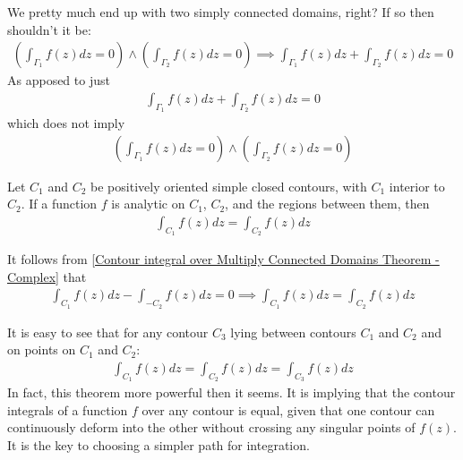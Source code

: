 \documentclass[12pt, english]{book}
\makeatletter
\renewenvironment{proof}[1][\proofname]{\par
	\pushQED{\qed}%
	\normalfont \topsep6\p@\@plus6\p@\relax
	\list{}{%
		\settowidth{\leftmargin}{\itshape\proofname:\hskip\labelsep}%
		\setlength{\labelwidth}{0pt}%
		\setlength{\itemindent}{-\leftmargin}%
	}%
	\item[\hskip\labelsep\itshape#1\@addpunct{:}]\ignorespaces
}{%
	\popQED\endlist\@endpefalse
}
\makeatother
\begin{document}
	\begin{question}
		We pretty much end up with two simply connected domains, right? If so then shouldn't it be:
		\begin{align*}
			\left( \int_{\Gamma_1} f(z) dz = 0 \right) \land \left( \int_{\Gamma_2} f(z) dz = 0 \right) \implies \int_{\Gamma_1} f(z) dz + \int_{\Gamma_2} f(z) dz = 0
		\end{align*}
		As apposed to just 
		\begin{align*}
			\int_{\Gamma_1} f(z) dz + \int_{\Gamma_2} f(z) dz = 0
		\end{align*}
		which does not imply
		\begin{align*}
			\left( \int_{\Gamma_1} f(z) dz = 0 \right) \land \left( \int_{\Gamma_2} f(z) dz = 0 \right)
		\end{align*}
	\end{question}

	\begin{corollary}
		\label{Principle of Deformation of Paths Corollary - Complex}
		Let \(C_1\) and \(C_2\) be positively oriented simple closed contours, with \(C_1\) interior to \(C_2\). If a function \(f\) is analytic on \(C_1\), \(C_2\), and the regions between them, then 
		\begin{align*}
			\int_{C_1} f(z) dz = \int_{C_2} f(z) dz
		\end{align*}
	\end{corollary}
	\begin{proof}
		It follows from \cref{Contour integral over Multiply Connected Domains Theorem - Complex} that 
		\begin{align*}
			\int_{C_1} f(z) dz - \int_{-C_2} f(z) dz = 0
			\implies \int_{C_1} f(z) dz = \int_{C_2} f(z) dz
		\end{align*}
	\end{proof}

	\begin{observation}
		It is easy to see that for any contour \(C_3\) lying between contours \(C_1\) and \(C_2\) and on points on \(C_1\) and \(C_2\):
		\begin{align*}
			\int_{C_1} f(z) dz = \int_{C_2} f(z) dz = \int_{C_3} f(z) dz 
		\end{align*}
		In fact, this theorem more powerful then it seems. It is implying that the contour integrals of a function \(f\) over any contour is equal, given that one contour can continuously deform into the other without crossing any singular points of \(f(z)\). It is the key to choosing a simpler path for integration.
	\end{observation}
\end{document}
